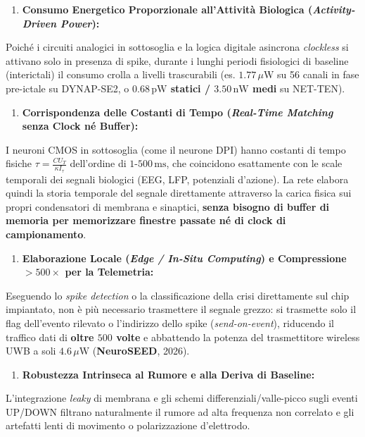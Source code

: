 \documentclass[11pt,a4paper]{article}
\begin{document}
\begin{enumerate}
  \item \textbf{Consumo Energetico Proporzionale all'Attività Biologica (\textit{Activity-Driven Power}):}
\end{enumerate}
Poiché i circuiti analogici in sottosoglia e la logica digitale asincrona \textit{clockless} si attivano solo in presenza di spike, durante i lunghi periodi fisiologici di baseline (interictali) il consumo crolla a livelli trascurabili (es. \textbf{$1.77\,\mu\text{W}$} su 56 canali in fase pre-ictale su DYNAP-SE2, o \textbf{$0.68\,\text{pW}$ statici / $3.50\,\text{nW}$ medi} su NET-TEN).
\begin{enumerate}
  \item \textbf{Corrispondenza delle Costanti di Tempo (\textit{Real-Time Matching} senza Clock né Buffer):}
\end{enumerate}
I neuroni CMOS in sottosoglia (come il neurone DPI) hanno costanti di tempo fisiche $\tau = \frac{C U_T}{\kappa I_\tau}$ dell'ordine di \textbf{$1\text{-}500\,\text{ms}$}, che coincidono esattamente con le scale temporali dei segnali biologici (EEG, LFP, potenziali d'azione). La rete elabora quindi la storia temporale del segnale direttamente attraverso la carica fisica sui propri condensatori di membrana e sinaptici, \textbf{senza bisogno di buffer di memoria per memorizzare finestre passate né di clock di campionamento}.
\begin{enumerate}
  \item \textbf{Elaborazione Locale (\textit{Edge / In-Situ Computing}) e Compressione $>500\times$ per la Telemetria:}
\end{enumerate}
Eseguendo lo \textit{spike detection} o la classificazione della crisi direttamente sul chip impiantato, non è più necessario trasmettere il segnale grezzo: si trasmette solo il flag dell'evento rilevato o l'indirizzo dello spike (\textit{send-on-event}), riducendo il traffico dati di \textbf{oltre $500$ volte} e abbattendo la potenza del trasmettitore wireless UWB a soli \textbf{$4.6\,\mu\text{W}$} (\textbf{NeuroSEED}, 2026).
\begin{enumerate}
  \item \textbf{Robustezza Intrinseca al Rumore e alla Deriva di Baseline:}
\end{enumerate}
L'integrazione \textit{leaky} di membrana e gli schemi differenziali/valle-picco sugli eventi UP/DOWN filtrano naturalmente il rumore ad alta frequenza non correlato e gli artefatti lenti di movimento o polarizzazione d'elettrodo.
\end{document}
